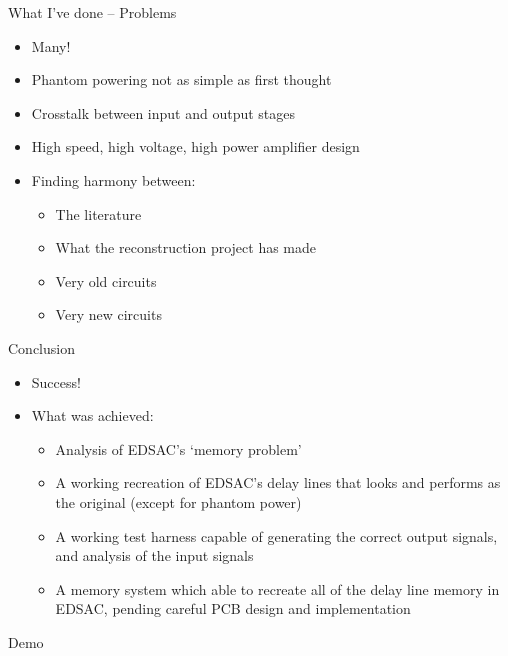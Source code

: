 \documentclass[aspectratio=169,11pt, xcolor={table}]{beamer}
\begin{document}
\begin{frame}{What I've done -- Problems}
	\begin{itemize}
		\item \alert{Many!}
		\item Phantom powering not as simple as first thought
		\item Crosstalk between input and output stages
		\item High speed, high voltage, high power amplifier design
		\item Finding harmony between:
		\begin{itemize}
			\item The literature
			\item What the reconstruction project has made
			\item Very old circuits
			\item Very new circuits
		\end{itemize}
	\end{itemize}
\end{frame}

\begin{frame}{Conclusion}
	\begin{itemize}
		\item \alert{Success!}
		\item What was achieved:
		\begin{itemize}
		\item Analysis of EDSAC's `memory problem'
		\item A working recreation of EDSAC's delay lines that looks and performs as the original (except for phantom power)
		\item A working test harness capable of generating the correct output signals, and analysis of the input signals
		\item A memory system which able to recreate all of the delay line memory in EDSAC, pending careful PCB design and implementation 
		\end{itemize}
	\end{itemize}
\end{frame}

\begin{frame}[standout]
	Demo
\end{frame}
\end{document}
